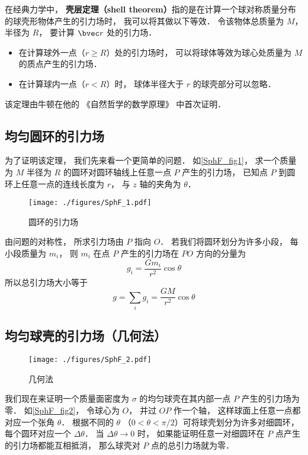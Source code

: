 

在经典力学中， \textbf{壳层定理（shell theorem）}指的是在计算一个球对称质量分布的球壳形物体产生的引力场时， 我可以将其做以下等效． 令该物体总质量为 $M$， 半径为 $R$， 要计算 $\bvec r$ 处的引力场．
\begin{itemize}
\item 在计算球外一点（$r \geqslant R$）处的引力场时， 可以将球体等效为球心处质量为 $M$ 的质点产生的引力场．
\item 在计算球内一点（$r < R$）时， 球体半径大于 $r$ 的球壳部分可以忽略．
\end{itemize}

该定理由牛顿在他的 《自然哲学的数学原理》 中首次证明．

\subsection{均匀圆环的引力场}
为了证明该定理， 我们先来看一个更简单的问题． 如\autoref{SphF_fig1}， 求一个质量为 $M$ 半径为 $R$ 的圆环对圆环轴线上任意一点 $P$ 产生的引力场， 已知点 $P$ 到圆环上任意一点的连线长度为 $r$， 与 $z$ 轴的夹角为 $\theta$．

\begin{figure}[ht]
\centering
\texttt{[image: ./figures/SphF\_1.pdf]}
\caption{圆环的引力场} \label{SphF_fig1}
\end{figure}

由问题的对称性， 所求引力场由 $P$ 指向 $O$． 若我们将圆环划分为许多小段， 每小段质量为 $m_i$， 则 $m_i$ 在点 $P$ 产生的引力场在 $PO$ 方向的分量为
\begin{equation}
g_i = \frac{Gm_i}{r^2}\cos\theta
\end{equation}
所以总引力场大小等于
\begin{equation}\label{SphF_eq2}
g = \sum_i g_i = \frac{GM}{r^2}\cos\theta
\end{equation}

\subsection{均匀球壳的引力场（几何法）}

\begin{figure}[ht]
\centering
\texttt{[image: ./figures/SphF\_2.pdf]}
\caption{几何法} \label{SphF_fig2}
\end{figure}

我们现在来证明一个质量面密度为 $\sigma$ 的均匀球壳在其内部一点 $P$ 产生的引力场为零． 如\autoref{SphF_fig2}， 令球心为 $O$， 并过 $OP$ 作一个轴， 这样球面上任意一点都对应一个张角 $\theta$． 根据不同的 $\theta$ （$0 < \theta < \pi/2$）可将球壳划分为许多对细圆环， 每个圆环对应一个 $\Delta\theta$． 当 $\Delta\theta\to 0$ 时， 如果能证明任意一对细圆环在 $P$ 点产生的引力场都能互相抵消， 那么球壳对 $P$ 点的总引力场就为零．

